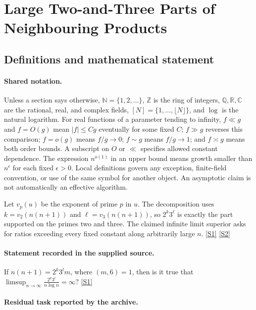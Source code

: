 \documentclass[11pt,a4paper]{article}
\newcommand{\N}{\mathbb{N}}
\newcommand{\Z}{\mathbb{Z}}
\newcommand{\Q}{\mathbb{Q}}
\newcommand{\R}{\mathbb{R}}
\newcommand{\C}{\mathbb{C}}
\newcommand{\sref}[2]{\hyperlink{source:#1:#2}{[S#2]}}
\begin{document}
\section{Large Two-and-Three Parts of Neighbouring Products}\label{statement}


\subsection{Definitions and mathematical statement}

\paragraph{Shared notation.}Unless a section says otherwise, $\N=\{1,2,\ldots\}$,
$\Z$ is the ring of integers, $\Q,\R,\C$ are the rational, real, and complex
fields, $[N]=\{1,\ldots,\lfloor N\rfloor\}$, and $\log$ is the natural
logarithm. For real functions of a parameter tending to infinity,
$f\ll g$ and $f=O(g)$ mean $|f|\leq Cg$ eventually for some fixed $C$;
$f\gg g$ reverses this comparison; $f=o(g)$ means $f/g\to0$;
$f\sim g$ means $f/g\to1$; and $f\asymp g$ means both order bounds.
A subscript on $O$ or $\ll$ specifies allowed constant dependence.
The expression $n^{o(1)}$ in an upper bound means growth smaller than
$n^\epsilon$ for each fixed $\epsilon>0$. Local definitions govern any
exception, finite-field convention, or use of the same symbol for another
object. An asymptotic claim is not automatically an effective algorithm.



Let $v_p(u)$ be the exponent of prime $p$ in $u$. The decomposition uses $k=v_2(n(n+1))$ and $\ell=v_3(n(n+1))$, so $2^k3^\ell$ is exactly the part supported on the primes two and three. The claimed infinite limit superior asks for ratios exceeding every fixed constant along arbitrarily large $n$. \sref{statement}{1} \sref{statement}{2}

\paragraph{Statement recorded in the supplied source.}
If $n(n+1)=2^k3^lm$, where $(m,6)=1$, then is it true that $ \limsup_{n\to \infty} \frac{2^k3^l}{n\log n}=\infty? $ \sref{statement}{1}

\paragraph{Residual task reported by the archive.}
\end{document}

